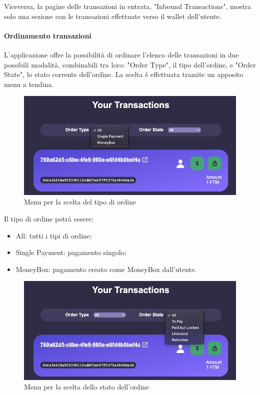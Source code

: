             Viceversa, la pagine delle transazioni in entrata, "Inbound Transactions", mostra solo una sezione con le transazioni effettuate verso il wallet dell'utente.

            \paragraph{Ordinamento transazioni}

            L'applicazione offre la possibilità di ordinare l'elenco delle transazioni in due possibili modalità, combinabili tra loro: 
            "Order Type", il tipo dell'ordine, e "Order State", lo stato corrente dell'ordine.
            La scelta è effettuata tramite un apposito menu a tendina.

            \begin{figure}[H]
                \centering
                \includegraphics[scale=0.4]{immagini/ordertype.jpg}
             \caption{Menu per la scelta del tipo di ordine}
            \end{figure}

            Il tipo di ordine potrà essere:
            \begin{itemize}
                \item All: tutti i tipi di ordine;
                \item Single Payment: pagamento singolo;
                \item MoneyBox: pagamento creato come MoneyBox dall'utente.
            \end{itemize}

            \begin{figure}[H]
                \centering
                \includegraphics[scale=0.4]{immagini/orderstate.jpg}
                \caption{Menu per la scelta dello stato dell'ordine}
            \end{figure}


